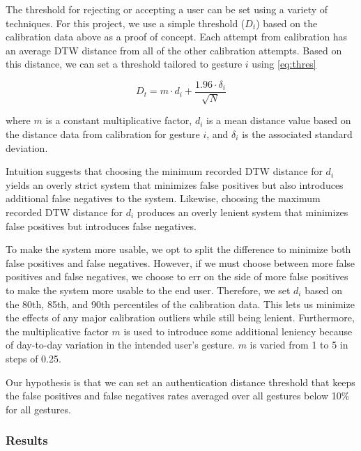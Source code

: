 The threshold for rejecting or accepting a user can be set using a variety of techniques. For this project, we use a simple threshold ($D_{t}$) based on the calibration data above as a proof of concept. Each attempt from calibration has an average \gls{DTW} distance from all of the other calibration attempts. Based on this distance, we can set a threshold tailored to gesture $i$ using \autoref{eq:thres}

\begin{equation}
D_{t} = m \cdot d_{i} + \frac{1.96 \cdot \delta_{i}}  {\sqrt{N}}
\label{eq:thres}
\end{equation}

\noindent where $m$ is a constant multiplicative factor, $d_{i}$ is a mean distance value based on the distance data from calibration for gesture $i$, and $\delta_{i}$ is the associated standard deviation.

Intuition suggests that choosing the minimum recorded \gls{DTW} distance for $d_{i}$ yields an overly strict system that minimizes false positives but also introduces additional false negatives to the system. Likewise, choosing the maximum recorded \gls{DTW} distance for $d_{i}$ produces an overly lenient system that minimizes false positives but introduces false negatives. 

To make the system more usable, we opt to split the difference to minimize both false positives and false negatives. However, if we must choose between more false positives and false negatives, we choose to err on the side of more false positives to make the system more usable to the end user. Therefore, we set $d_{i}$ based on the 80th, 85th, and 90th percentiles of the calibration data. This lets us minimize the effects of any major calibration outliers while still being lenient. Furthermore, the multiplicative factor $m$ is used to introduce some additional leniency because of day-to-day variation in the intended user's gesture. $m$ is varied from 1 to 5 in steps of 0.25.

Our hypothesis is that we can set an authentication distance threshold that keeps the false positives and false negatives rates averaged over all gestures below 10\% for all gestures.

\subsubsection{Results}

